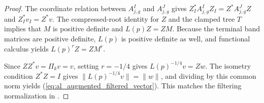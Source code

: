 \begin{proof}
    \leanok
    The coordinate relation between $A^I_{j,g}$ and $A^J_{j,g}$ gives
    $Z_I^*A^I_{j,g}Z_I=Z^*A^J_{j,g}Z$ and $Z_I^*v_I=Z^*v$.
    The compressed-root identity for $Z$ and the clamped tree $T$
    implies that $M$ is positive definite and $L(p)Z=ZM$.
    Because the terminal band matrices are positive definite, $L(p)$ is
    positive definite as well, and functional calculus yields $L(p)^rZ=ZM^r$.

    Since $ZZ^*v=\Pi_kv=v$, setting $r=-1/4$ gives
    $L(p)^{-1/4}v=Zw$. The isometry condition $Z^*Z=I$ gives
    $\|L(p)^{-1/4}v\|=\|w\|$, and dividing by this common norm yields
    (\ref{eq:al_augmented_filtered_vector}).
    This matches the filtering normalization in
    \cite[Section~7]{OpenAI2026AreaLaw}.
\end{proof}
